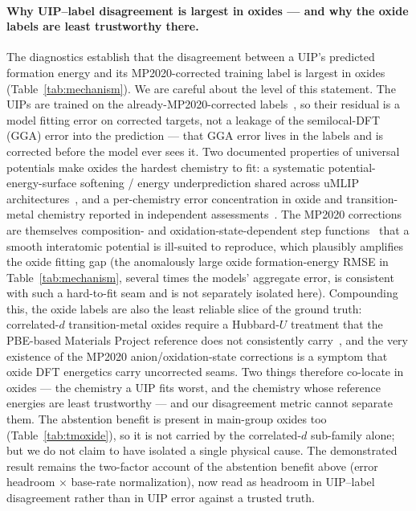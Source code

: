\documentclass[aip,jcp,preprint,superscriptaddress,amsmath,amssymb]{revtex4-2}
\begin{document}
\paragraph{Why UIP--label disagreement is largest in oxides --- and why the oxide labels are
least trustworthy there.} The diagnostics establish that the disagreement between a UIP's
predicted formation energy and its MP2020-corrected training label is largest in oxides
(Table~\ref{tab:mechanism}). We are careful about the level of this statement. The UIPs are
trained on the already-MP2020-corrected labels~\citep{deng2023,wang2021mp2020}, so their
residual is a model fitting error on corrected targets, not a leakage of the semilocal-DFT
(GGA) error into the prediction --- that GGA error lives in the labels and is corrected before the
model ever sees it. Two documented properties of universal potentials make oxides the hardest
chemistry to fit: a systematic potential-energy-surface softening / energy underprediction shared
across uMLIP architectures~\citep{deng2025softening}, and a per-chemistry error concentration in
oxide and transition-metal chemistry reported in independent
assessments~\citep{yu2024assessment}. The MP2020 corrections are themselves
composition- and oxidation-state-dependent step functions~\citep{wang2021mp2020} that a smooth
interatomic potential is ill-suited to reproduce, which plausibly amplifies the oxide fitting gap
(the anomalously large oxide formation-energy RMSE in Table~\ref{tab:mechanism}, several times the
models' aggregate error, is consistent with such a hard-to-fit seam and is not separately
isolated here). Compounding this, the oxide labels are also the least reliable slice of the
ground truth: correlated-$d$ transition-metal oxides require a Hubbard-$U$ treatment that the
PBE-based Materials Project reference does not consistently carry~\citep{wang2006oxidation,
jain2011formation}, and the very existence of the MP2020 anion/oxidation-state corrections is a
symptom that oxide DFT energetics carry uncorrected seams. Two things therefore co-locate in
oxides --- the chemistry a UIP fits worst, and the chemistry whose reference energies are least
trustworthy --- and our disagreement metric cannot separate them. The abstention benefit is
present in main-group oxides too (Table~\ref{tab:tmoxide}), so it is not carried by the
correlated-$d$ sub-family alone; but we do not claim to have isolated a single physical cause. The
demonstrated result remains the two-factor account of the abstention benefit above (error headroom
$\times$ base-rate normalization), now read as headroom in UIP--label disagreement rather
than in UIP error against a trusted truth.
\end{document}
